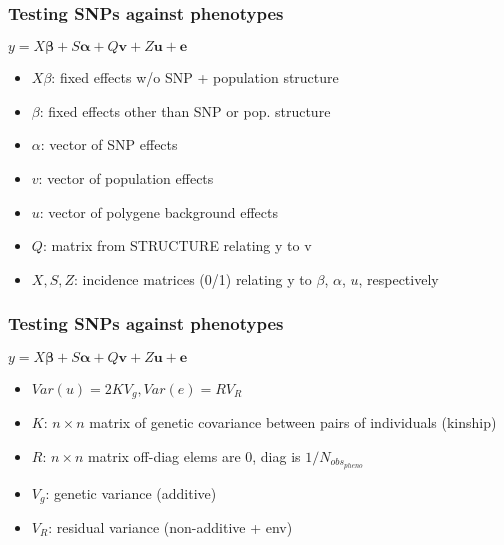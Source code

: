 \begin{frame}
\frametitle{Testing SNPs against phenotypes}
\begin{block}{}
\begin{center}
\Large{$y=X \bm{\beta} + S \bm{\alpha} + Q \bm{v} + Z \bm{u} + \bm{e}$}
\end{center}
\begin{itemize}
\item{$X \beta$: fixed effects w/o SNP + population structure}
\item{$\beta$: fixed effects other than SNP or pop. structure}
\item{$\alpha$: vector of SNP effects}
\item{$v$: vector of population effects}
\item{$u$: vector of polygene background effects}
\item{$Q$: matrix from STRUCTURE relating y to v}
\item{$X, S, Z$: incidence matrices (0/1) relating y to $\beta$, $\alpha$, $u$,
respectively}
\end{itemize}
\end{block}
\tiny
\citet{Yu:2006ij}
\end{frame}

\begin{frame}
\frametitle{Testing SNPs against phenotypes}
\begin{block}{}
\begin{center}
\Large{$y=X \bm{\beta} + S \bm{\alpha} + Q \bm{v} + Z \bm{u} + \bm{e}$}
\end{center}
\begin{itemize}
\item{$Var(u) = 2KV_g, Var(e) = RV_R$}
\item{$K$: $n \times n$ matrix of genetic covariance between pairs of
individuals (kinship)}
\item{$R$: $n \times n$ matrix off-diag elems are 0, diag is
$1/N_{{obs}_{pheno}}$}
\item{$V_g$: genetic variance (additive)}
\item{$V_R$: residual variance (non-additive + env)}
\end{itemize}
\end{block}
\tiny
\citet{Yu:2006ij}
\end{frame}